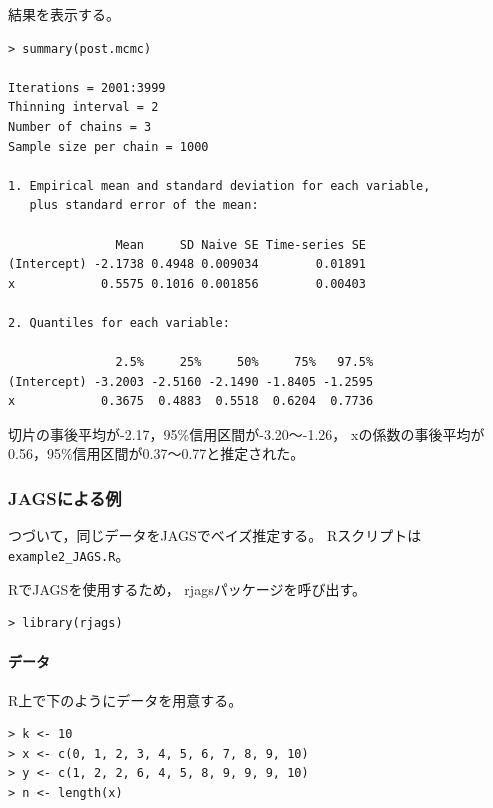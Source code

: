 \documentclass[11pt,uplatex]{jsarticle}
\begin{document}
結果を表示する。
\begin{lstlisting}
> summary(post.mcmc)

Iterations = 2001:3999
Thinning interval = 2 
Number of chains = 3 
Sample size per chain = 1000 

1. Empirical mean and standard deviation for each variable,
   plus standard error of the mean:

               Mean     SD Naive SE Time-series SE
(Intercept) -2.1738 0.4948 0.009034        0.01891
x            0.5575 0.1016 0.001856        0.00403

2. Quantiles for each variable:

               2.5%     25%     50%     75%   97.5%
(Intercept) -3.2003 -2.5160 -2.1490 -1.8405 -1.2595
x            0.3675  0.4883  0.5518  0.6204  0.7736

\end{lstlisting}
切片の事後平均が-2.17，95\%信用区間が-3.20〜-1.26，
xの係数の事後平均が0.56，95\%信用区間が0.37〜0.77と推定された。



\subsubsection{JAGSによる例}

つづいて，同じデータを\textsf{JAGS}でベイズ推定する。
\textsf{R}スクリプトは\texttt{example2\_JAGS.R}。


\textsf{R}で\textsf{JAGS}を使用するため，
\textsf{rjags}パッケージを呼び出す。
\begin{lstlisting}
> library(rjags)
\end{lstlisting}

\paragraph{データ}
\textsf{R}上で下のようにデータを用意する。
\begin{lstlisting}
> k <- 10
> x <- c(0, 1, 2, 3, 4, 5, 6, 7, 8, 9, 10)
> y <- c(1, 2, 2, 6, 4, 5, 8, 9, 9, 9, 10)
> n <- length(x)
\end{lstlisting}
\end{document}
